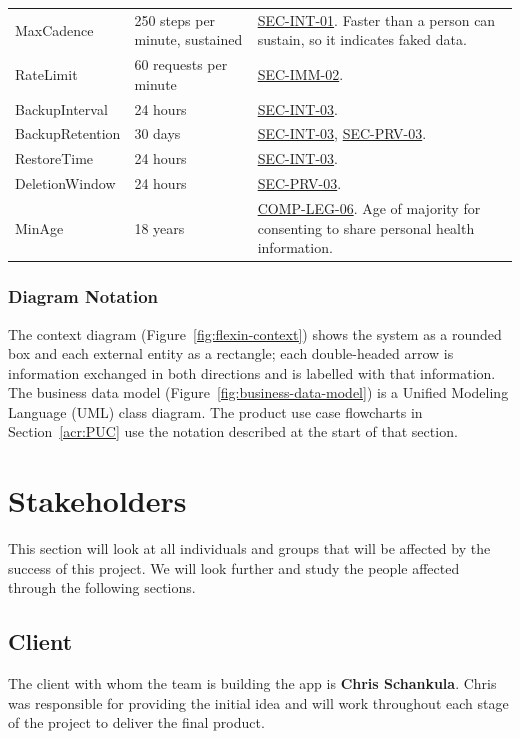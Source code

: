 \documentclass[12pt]{article}
\newcommand{\acr}[3]{\phantomsection\label{acr:#1}#2 (#3)}
\begin{document}
{\begin{xltabular}{\textwidth}{|p{4.1cm}|p{3.4cm}|X|}
\textsf{MaxCadence}\hypertarget{const:MaxCadence}{} & 250 steps per minute, sustained & \hyperlink{req:SEC-INT-01}{SEC-INT-01}. Faster than a person can sustain, so it indicates faked data. \\
\textsf{RateLimit}\hypertarget{const:RateLimit}{} & 60 requests per minute & \hyperlink{req:SEC-IMM-02}{SEC-IMM-02}. \\
\textsf{BackupInterval}\hypertarget{const:BackupInterval}{} & 24 hours & \hyperlink{req:SEC-INT-03}{SEC-INT-03}. \\
\textsf{BackupRetention}\hypertarget{const:BackupRetention}{} & 30 days & \hyperlink{req:SEC-INT-03}{SEC-INT-03}, \hyperlink{req:SEC-PRV-03}{SEC-PRV-03}. \\
\textsf{RestoreTime}\hypertarget{const:RestoreTime}{} & 24 hours & \hyperlink{req:SEC-INT-03}{SEC-INT-03}. \\
\textsf{DeletionWindow}\hypertarget{const:DeletionWindow}{} & 24 hours & \hyperlink{req:SEC-PRV-03}{SEC-PRV-03}. \\
\textsf{MinAge}\hypertarget{const:MinAge}{} & 18 years & \hyperlink{req:COMP-LEG-06}{COMP-LEG-06}. Age of majority for consenting to share personal health information. \\
\hline
\end{xltabular}
}

\subsubsection{Diagram Notation}

The context diagram (Figure~\ref{fig:flexin-context}) shows the \progname{}
system as a rounded box and each external entity as a rectangle; each
double-headed arrow is information exchanged in both directions and is labelled
with that information. The business data model
(Figure~\ref{fig:business-data-model}) is a \acr{UML}{Unified Modeling Language}{UML}
class diagram. The product use case flowcharts in
Section~\ref{acr:PUC} use the notation described at the start of that section.

\section{Stakeholders}
This section will look at all individuals and groups that will be affected by the success of this project. We will look further and study the people affected through the following sections. 
\subsection{Client}
The client with whom the team is building the app is \textbf{Chris Schankula}. 
Chris was responsible for providing the initial idea and will work throughout each stage of the project to deliver the final product.
\end{document}
